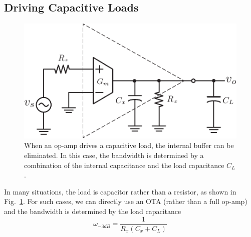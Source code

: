 \subsection{Driving Capacitive Loads}
\begin{figure}[tb]
\centering
\includegraphics[scale=1]{ota_amp_capload}
\caption{When an op-amp drives a capacitive load, the internal buffer can be eliminated.  In this case, the bandwidth is determined by a combination of the internal capacitance and the load capacitance $C_L$.}
\label{fig:ota_amp_capload}
\end{figure}
In many situations, the load is capacitor rather than a resistor, as shown in Fig.~\ref{fig:ota_amp_capload}.
For such cases, we can directly use an OTA (rather than a full op-amp) and the bandwidth is determined by the load capacitance
    \begin{equation}
        {\omega _{ - 3dB}} = \frac{1}{{{R_x}({C_x} + {C_L})}}
    \end{equation}
%
%
